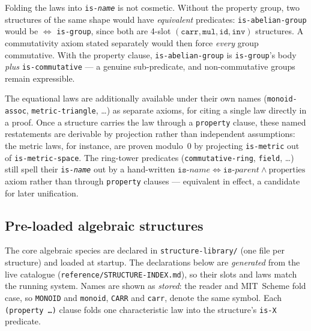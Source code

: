 \begin{remark}
Folding the laws into \texttt{is-\textit{name}} is not cosmetic.  Without
the property group, two structures of the same shape would have
\emph{equivalent} predicates: \texttt{is-abelian-group} would be
$\Leftrightarrow$ \texttt{is-group}, since both are 4-slot
$(\mathtt{carr}, \mathtt{mul}, \mathtt{id}, \mathtt{inv})$ structures.  A
commutativity axiom stated separately would then force \emph{every}
group commutative.  With the property clause, \texttt{is-abelian-group}
is \texttt{is-group}'s body \emph{plus} \texttt{is-commutative} --- a
genuine sub-predicate, and non-commutative groups remain expressible.
\end{remark}

\begin{remark}
The equational laws are additionally available under their own names
(\texttt{monoid-assoc}, \texttt{metric-triangle}, \ldots) as separate
axioms, for citing a single law directly in a proof.  Once a structure
carries the law through a \texttt{property} clause, these named
restatements are derivable by projection rather than independent
assumptions: the metric laws, for instance, are proven modulo~0 by
projecting \texttt{is-metric} out of \texttt{is-metric-space}.  The
ring-tower predicates
(\texttt{commutative-ring}, \texttt{field}, \ldots) still spell their
\texttt{is-\textit{name}} out by a hand-written
$\texttt{is-}\mathit{name} \Leftrightarrow \texttt{is-}\mathit{parent}
\land \text{properties}$ axiom rather than through \texttt{property}
clauses --- equivalent in effect, a candidate for later unification.
\end{remark}

\subsection{Pre-loaded algebraic structures}
\label{sec:algebraic}

The core algebraic species are declared in \texttt{structure-library/} (one file
per structure) and loaded at startup.  The declarations below are \emph{generated}
from the live catalogue (\texttt{reference/STRUCTURE-INDEX.md}), so their slots and
laws match the running system.  Names are shown as \emph{stored}: the reader and
MIT~Scheme fold case, so \texttt{MONOID} and \texttt{monoid}, \texttt{CARR} and
\texttt{carr}, denote the same symbol.  Each \texttt{(property \ldots)} clause folds
one characteristic law into the structure's \texttt{is-X} predicate.

